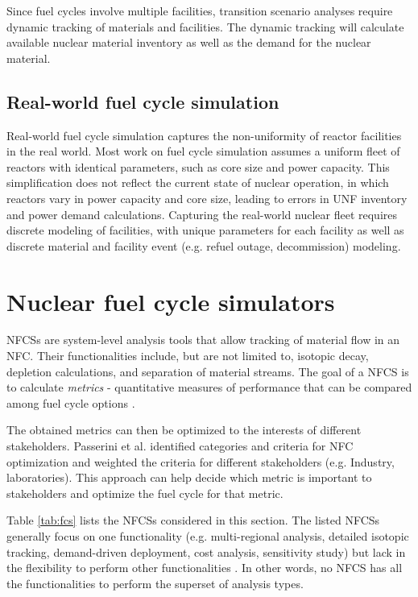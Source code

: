 Since fuel cycles involve multiple facilities,
transition scenario analyses require
dynamic tracking of materials and facilities.
The dynamic tracking will calculate available nuclear material
inventory as well as the demand for the nuclear
material.

\subsection{Real-world fuel cycle simulation}
Real-world fuel cycle simulation captures the non-uniformity of
reactor facilities in the real world. Most work on fuel cycle
simulation assumes a uniform fleet of reactors with identical
parameters, such as core size and power capacity. This simplification
does not reflect the current state of nuclear operation, in which
reactors vary in power capacity and core size, leading
to errors in \gls{UNF} inventory and power demand calculations.
Capturing the real-world nuclear fleet requires discrete
modeling of facilities, with unique parameters for each facility
as well as discrete material and facility event (e.g. refuel outage,
decommission) modeling.

\section{Nuclear fuel cycle simulators}
\glspl{NFCS} are system-level analysis tools
that allow tracking of material flow in an \gls{NFC}. Their
functionalities include, but are not limited to, isotopic decay,
depletion calculations, and separation of material streams.
The goal of a \gls{NFCS} is to calculate \textit{metrics} - quantitative
measures of performance that can be compared among fuel cycle
options \cite{huff_fundamental_2016}.

The obtained metrics can then be optimized to the interests
of different stakeholders. Passerini et al. \cite{passerini_systematic_2014}
identified categories and criteria for \gls{NFC} optimization and
weighted the criteria for different stakeholders (e.g. Industry, laboratories).
This approach can help decide which metric is important to stakeholders
and optimize the fuel cycle for that metric.

Table \ref{tab:fcs} lists the \glspl{NFCS}
considered in this section. The listed \glspl{NFCS}
generally focus on one functionality
(e.g. multi-regional analysis, detailed isotopic tracking,
demand-driven deployment, cost analysis, sensitivity study)
but lack in the flexibility to perform other
functionalities \cite{huff_next_2010}. In
other words, no \gls{NFCS} has all the functionalities to
perform the superset of analysis types.

